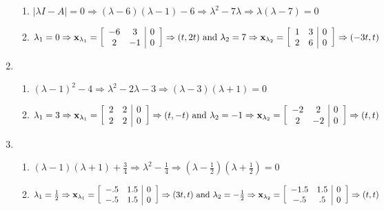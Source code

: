 \documentclass[12pt]{article}
\begin{document}
\begin{enumerate}
\begin{enumerate}
      \item $|\lambda I-A|=0\Rightarrow (\lambda-6)(\lambda-1)-6\Rightarrow \lambda^2-7\lambda\Rightarrow \lambda(\lambda-7)=0$

      \item $\lambda_1=0\Rightarrow\bold{x}_{\lambda_1}=\left[\begin{array}{cc|c} -6 & 3 & 0\\2 & -1 & 0  \end{array}\right]\Rightarrow (t, 2t)\text{ and }\lambda_2=7\Rightarrow\bold{x}_{\lambda_2}=\left[\begin{array}{cc|c} 1 & 3 & 0\\2 & 6 & 0  \end{array}\right]\Rightarrow (-3t, t)$

    \end{enumerate}

    \setcounter{enumi}{16}

  \item

    \begin{enumerate}

      \item $(\lambda-1)^2-4\Rightarrow \lambda^2-2\lambda-3\Rightarrow (\lambda-3)(\lambda+1)=0$

      \item $\lambda_1=3\Rightarrow \bold{x}_{\lambda_1}=\left[ \begin{array}{cc|c} 2 & 2 & 0\\ 2 & 2 & 0  \end{array} \right]\Rightarrow (t,-t)\text{ and }\lambda_2=-1\Rightarrow \bold{x}_{\lambda_2}=\left[ \begin{array}{cc|c} -2 & 2 & 0\\ 2 & -2 & 0 \end{array} \right]\Rightarrow (t,t)$

    \end{enumerate}

    \setcounter{enumi}{18}

  \item

    \begin{enumerate}

      \item $(\lambda-1)(\lambda+1)+\frac{3}{4}\Rightarrow \lambda^2-\frac{1}{4}\Rightarrow \left( \lambda-\frac{1}{2} \right)\left( \lambda+\frac{1}{2} \right)=0$

      \item $\lambda_1=\frac{1}{2}\Rightarrow \bold{x}_{\lambda_1}=\left[ \begin{array}{cc|c} -.5 & 1.5 & 0\\ -.5 & 1.5 & 0  \end{array} \right]\Rightarrow (3t,t)\text{ and }\lambda_2=-\frac{1}{2}\Rightarrow \bold{x}_{\lambda_2}=\left[ \begin{array}{cc|c} -1.5 & 1.5 & 0\\ -.5 & .5 & 0 \end{array} \right]\Rightarrow (t,t)$


\end{enumerate}
\end{enumerate}
\end{document}
